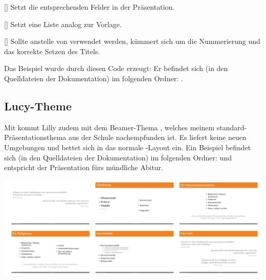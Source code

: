 %
%
%

[\cmdlist{}\cmdlist{}\secline{}\cmdlist{}\cmdlist{}\cmdlist\secline{}\cmdlist{}\cmdlist\secline{}\cmdlist{}\cmdlist\secline{}\cmdlist{}\cmdlist\secline{}]
Setzt die entsprechenden Felder in der Präsentation.

%
%
%

[]
Setzt eine Liste analog zur Vorlage.

%
%
%

[]
Sollte anstelle von  verwendet werden, kümmert sich um die Nummerierung und das korrekte Setzen des Titels.

\begin{bemerkung}
    Das  Beispiel wurde durch diesen Code erzeugt:
    Er befindet sich (in den Quelldateien der Dokumentation) im folgenden Ordner:  .
\end{bemerkung}

\subsection{Lucy-Theme}
Mit  kommt Lilly zudem mit dem Beamer-Thema , welches meinem standard-Präsentationsthema aus der Schule nachempfunden ist. Es liefert keine neuen Umgebungen und bettet sich in das normale -Layout ein. Ein Beispiel befindet sich (in den Quelldateien der Dokumentation) im folgenden Ordner:  und entspricht der Präsentation fürs mündliche Abitur.
\begin{example}
    \begin{center}
        \includegraphics[width=\linewidth] {Data/Bilder/lucy-preview.png}
    \end{center}
\end{example}

